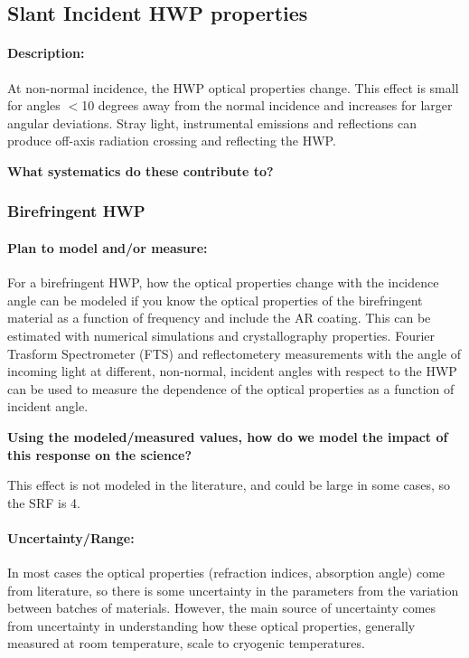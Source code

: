 \subsection{Slant Incident HWP properties}

\paragraph{Description:}
At non-normal incidence, the HWP optical properties change. This effect is small for angles $<$10 degrees away from the normal incidence and increases for larger angular deviations. Stray light, instrumental emissions and reflections can produce off-axis radiation crossing and reflecting the HWP.

\textbf{What systematics do these contribute to?}

\subsubsection{Birefringent HWP}

\paragraph{Plan to model and/or measure:}
For a birefringent HWP, how the optical properties change with the incidence angle can be modeled if you know the optical properties of the birefringent material as a function of frequency and include the AR coating. This can be estimated with numerical simulations and crystallography properties. Fourier Trasform Spectrometer (FTS) and reflectometery measurements with the angle of incoming light at different, non-normal, incident angles with respect to the HWP can be used to measure the dependence of the optical properties as a function of incident angle.

\textbf{Using the modeled/measured values, how do we model the impact of this response on the science?}

This effect is not modeled in the literature, and could be large in some cases, so the SRF is 4.

\paragraph{Uncertainty/Range:}
In most cases the optical properties (refraction indices, absorption angle) come from literature, so there is some uncertainty in the parameters from the variation between batches of materials. However, the main source of uncertainty comes from uncertainty in understanding how these optical properties, generally measured at room temperature, scale to cryogenic temperatures.

